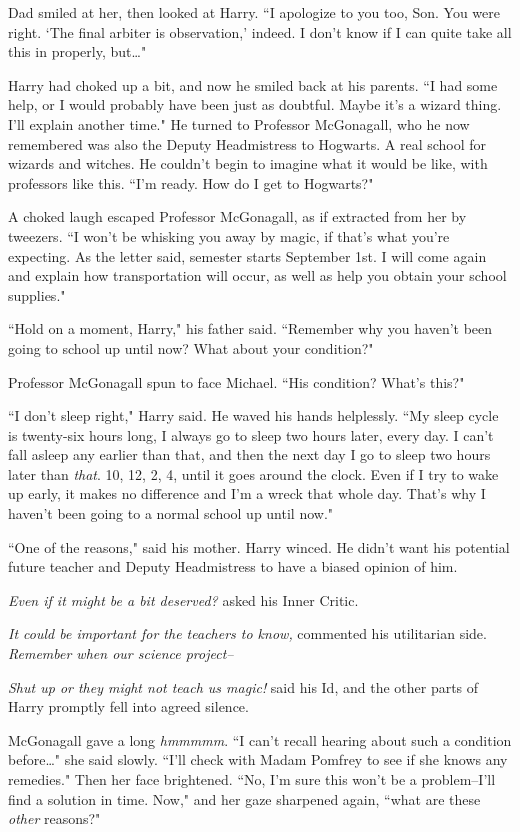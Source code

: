 Dad smiled at her, then looked at Harry. ``I apologize to you too, Son. You were right. `The final arbiter is observation,' indeed. I don't know if I can quite take all this in properly, but{\ldots}"

Harry had choked up a bit, and now he smiled back at his parents. ``I had some help, or I would probably have been just as doubtful. Maybe it's a wizard thing. I'll explain another time." He turned to Professor McGonagall, who he now remembered was also the Deputy Headmistress to Hogwarts. A real school for wizards and witches. He couldn't begin to imagine what it would be like, with professors like this. ``I'm ready. How do I get to Hogwarts?"

A choked laugh escaped Professor McGonagall, as if extracted from her by tweezers. ``I won't be whisking you away by magic, if that's what you're expecting. As the letter said, semester starts September 1st. I will come again and explain how transportation will occur, as well as help you obtain your school supplies."

``Hold on a moment, Harry," his father said. ``Remember why you haven't been going to school up until now? What about your condition?"

Professor McGonagall spun to face Michael. ``His condition? What's this?"

``I don't sleep right," Harry said. He waved his hands helplessly. ``My sleep cycle is twenty-six hours long, I always go to sleep two hours later, every day. I can't fall asleep any earlier than that, and then the next day I go to sleep two hours later than \emph{that}. 10\pm, 12\am, 2\am, 4\am, until it goes around the clock. Even if I try to wake up early, it makes no difference and I'm a wreck that whole day. That's why I haven't been going to a normal school up until now."

``One of the reasons," said his mother. Harry winced. He didn't want his potential future teacher and Deputy Headmistress to have a biased opinion of him.

\emph{Even if it might be a bit deserved?} asked his Inner Critic.

\emph{It could be important for the teachers to know,} commented his utilitarian side. \emph{Remember when our science project\---}

\emph{Shut up or they might not teach us magic!} said his Id, and the other parts of Harry promptly fell into agreed silence.

McGonagall gave a long \emph{hmmmmm}. ``I can't recall hearing about such a condition before{\ldots}" she said slowly. ``I'll check with Madam Pomfrey to see if she knows any remedies." Then her face brightened. ``No, I'm sure this won't be a problem\---I'll find a solution in time. Now," and her gaze sharpened again, ``what are these \emph{other} reasons?"

